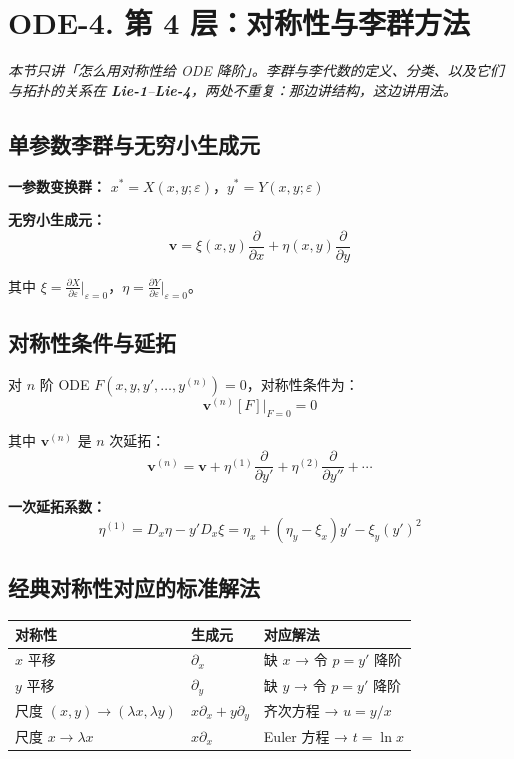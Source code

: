 \section{ODE-4. 第 4 层：对称性与李群方法}


\noindent\textit{本节只讲「怎么用对称性给 ODE 降阶」。李群与李代数的定义、分类、以及它们与拓扑的关系在
\textbf{Lie-1}--\textbf{Lie-4}，两处不重复：那边讲结构，这边讲用法。}


\subsection{单参数李群与无穷小生成元}

\textbf{一参数变换群：} $x^* = X(x,y;\varepsilon)$，$y^* = Y(x,y;\varepsilon)$

\textbf{无穷小生成元：}
\[
\mathbf{v} = \xi(x,y)\frac{\partial}{\partial x} + \eta(x,y)\frac{\partial}{\partial y}
\]

其中 $\xi = \frac{\partial X}{\partial \varepsilon}\big|_{\varepsilon=0}$，$\eta = \frac{\partial Y}{\partial \varepsilon}\big|_{\varepsilon=0}$。

\subsection{对称性条件与延拓}

对 $n$ 阶 ODE $F(x, y, y', \ldots, y^{(n)}) = 0$，对称性条件为：
\[
\mathbf{v}^{(n)}[F]\big|_{F=0} = 0
\]

其中 $\mathbf{v}^{(n)}$ 是 $n$ 次延拓：
\[
\mathbf{v}^{(n)} = \mathbf{v} + \eta^{(1)}\frac{\partial}{\partial y'} + \eta^{(2)}\frac{\partial}{\partial y''} + \cdots
\]

\textbf{一次延拓系数：}
\[
\eta^{(1)} = D_x\eta - y'D_x\xi = \eta_x + (\eta_y - \xi_x)y' - \xi_y(y')^2
\]

\subsection{经典对称性对应的标准解法}

\begin{center}
\begin{tabular}{L{4cm}L{3.5cm}L{4cm}}
\toprule
\textbf{对称性} & \textbf{生成元} & \textbf{对应解法} \\
\midrule
$x$ 平移 & $\partial_x$ & 缺 $x$ → 令 $p = y'$ 降阶 \\
$y$ 平移 & $\partial_y$ & 缺 $y$ → 令 $p = y'$ 降阶 \\
尺度 $(x,y)\to(\lambda x, \lambda y)$ & $x\partial_x + y\partial_y$ & 齐次方程 → $u = y/x$ \\
尺度 $x \to \lambda x$ & $x\partial_x$ & Euler 方程 → $t = \ln x$ \\
\bottomrule
\end{tabular}
\end{center}

